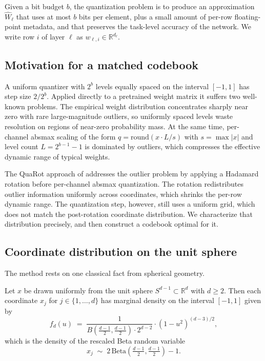 Given a bit budget $b$, the quantization problem is to produce an
approximation $\widehat{W}_\ell$ that uses at most $b$ bits per element,
plus a small amount of per-row floating-point metadata, and that preserves
the task-level accuracy of the network. We write row $i$ of layer $\ell$ as
$w_{\ell,i} \in \mathbb{R}^{d_\ell}$.

\subsection{Motivation for a matched codebook}
\label{sec:method-motivation}

A uniform quantizer with $2^b$ levels equally spaced on the interval
$[-1, 1]$ has step size $2/2^b$. Applied directly to a pretrained weight
matrix it suffers two well-known problems. The empirical weight
distribution concentrates sharply near zero with rare large-magnitude
outliers, so uniformly spaced levels waste resolution on regions of
near-zero probability mass. At the same time, per-channel absmax scaling of
the form $q = \text{round}(x \cdot L / s)$ with $s = \max |x|$ and level
count $L = 2^{b-1} - 1$ is dominated by outliers, which compresses the
effective dynamic range of typical weights.

The QuaRot approach of \citet{ashkboos2024quarot} addresses the outlier
problem by applying a Hadamard rotation before per-channel absmax
quantization. The rotation redistributes outlier information uniformly
across coordinates, which shrinks the per-row dynamic range. The
quantization step, however, still uses a uniform grid, which does not match
the post-rotation coordinate distribution. We characterize that
distribution precisely, and then construct a codebook optimal for it.

\subsection{Coordinate distribution on the unit sphere}
\label{sec:method-distribution}

The method rests on one classical fact from spherical geometry.

\begin{proposition}
\label{prop:sphere}
Let $x$ be drawn uniformly from the unit sphere
$S^{d-1} \subset \mathbb{R}^d$ with $d \geq 2$. Then each coordinate $x_j$
for $j \in \{1, \ldots, d\}$ has marginal density on the interval
$[-1, 1]$ given by
\begin{equation}
f_d(u) \;=\;
   \frac{1}{B\!\left(\tfrac{d-1}{2}, \tfrac{d-1}{2}\right) \cdot 2^{d-2}}
   \cdot (1 - u^2)^{(d-3)/2},
\label{eq:spherical-density}
\end{equation}
which is the density of the rescaled Beta random variable
\begin{equation}
x_j \;\sim\; 2\,\mathrm{Beta}\!\left(\tfrac{d-1}{2}, \tfrac{d-1}{2}\right) - 1.
\label{eq:spherical-rescaled}
\end{equation}
\end{proposition}

